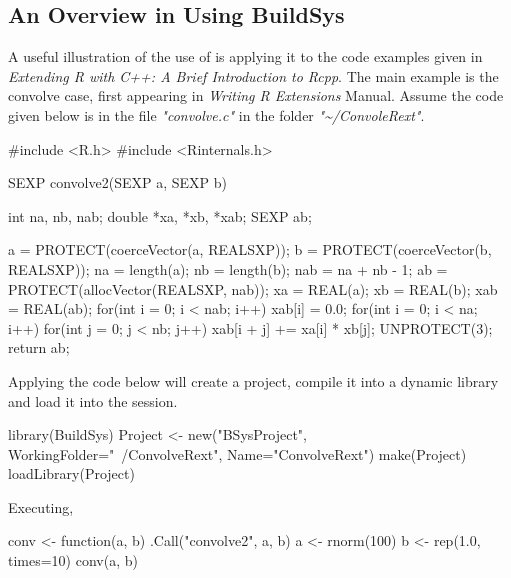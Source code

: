 \hypertarget{BuildSys-Overview}{%
\subsection{An Overview in Using BuildSys}
\label{visual-studio-code-extensions}}

A useful illustration of the use of  is applying it to the code examples given in \emph{Extending R with C++: A Brief Introduction to Rcpp}\citep{RcppIntro}. The main example is 
the convolve  case, first appearing in \emph{Writing R Extensions}\citep{Rextensions} Manual. Assume the code given below is in the file \emph{"convolve.c"} in the folder \emph{"\textasciitilde/ConvoleRext"}.

\begin{Schunk}
  \begin{Sinput}
  #include <R.h>
  #include <Rinternals.h>
  
  SEXP convolve2(SEXP a, SEXP b)
  {
      int na, nb, nab;
      double *xa, *xb, *xab;
      SEXP ab;
  
      a = PROTECT(coerceVector(a, REALSXP));
      b = PROTECT(coerceVector(b, REALSXP));
      na = length(a); nb = length(b); nab = na + nb - 1;
      ab = PROTECT(allocVector(REALSXP, nab));
      xa = REAL(a); xb = REAL(b); xab = REAL(ab);
      for(int i = 0; i < nab; i++) xab[i] = 0.0;
      for(int i = 0; i < na; i++)
          for(int j = 0; j < nb; j++) xab[i + j] += xa[i] * xb[j];
      UNPROTECT(3);
      return ab;
  }
  \end{Sinput}
\end{Schunk}

Applying the  code below will create a  project, compile it into a dynamic library and load it into the  session.

\begin{Schunk}
  \begin{Sinput}
  library(BuildSys)
  Project <- new("BSysProject", WorkingFolder="~/ConvolveRext", Name="ConvolveRext")
  make(Project)
  loadLibrary(Project)
  \end{Sinput}
\end{Schunk}

Executing,

\begin{Schunk}
  \begin{Sinput}
  conv <- function(a, b) .Call("convolve2", a, b)
  a <- rnorm(100)
  b <- rep(1.0, times=10)
  conv(a, b)
  \end{Sinput}
\end{Schunk}

